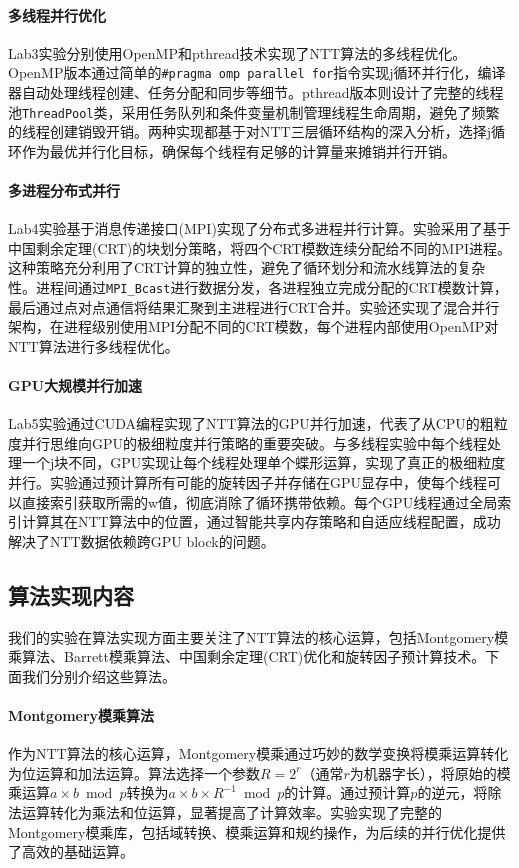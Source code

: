 \documentclass[a4paper]{article}
\begin{document}
\paragraph{多线程并行优化} Lab3实验分别使用OpenMP和pthread技术实现了NTT算法的多线程优化。OpenMP版本通过简单的\texttt{\#pragma omp parallel for}指令实现j循环并行化，编译器自动处理线程创建、任务分配和同步等细节。pthread版本则设计了完整的线程池\texttt{ThreadPool}类，采用任务队列和条件变量机制管理线程生命周期，避免了频繁的线程创建销毁开销。两种实现都基于对NTT三层循环结构的深入分析，选择j循环作为最优并行化目标，确保每个线程有足够的计算量来摊销并行开销。

\paragraph{多进程分布式并行} Lab4实验基于消息传递接口(MPI)实现了分布式多进程并行计算。实验采用了基于中国剩余定理(CRT)的块划分策略，将四个CRT模数连续分配给不同的MPI进程。这种策略充分利用了CRT计算的独立性，避免了循环划分和流水线算法的复杂性。进程间通过\texttt{MPI\_Bcast}进行数据分发，各进程独立完成分配的CRT模数计算，最后通过点对点通信将结果汇聚到主进程进行CRT合并。实验还实现了混合并行架构，在进程级别使用MPI分配不同的CRT模数，每个进程内部使用OpenMP对NTT算法进行多线程优化。

\paragraph{GPU大规模并行加速} Lab5实验通过CUDA编程实现了NTT算法的GPU并行加速，代表了从CPU的粗粒度并行思维向GPU的极细粒度并行策略的重要突破。与多线程实验中每个线程处理一个j块不同，GPU实现让每个线程处理单个蝶形运算，实现了真正的极细粒度并行。实验通过预计算所有可能的旋转因子并存储在GPU显存中，使每个线程可以直接索引获取所需的w值，彻底消除了循环携带依赖。每个GPU线程通过全局索引计算其在NTT算法中的位置，通过智能共享内存策略和自适应线程配置，成功解决了NTT数据依赖跨GPU block的问题。

\subsection{算法实现内容}

我们的实验在算法实现方面主要关注了NTT算法的核心运算，包括Montgomery模乘算法、Barrett模乘算法、中国剩余定理(CRT)优化和旋转因子预计算技术。下面我们分别介绍这些算法。

\paragraph{Montgomery模乘算法} 作为NTT算法的核心运算，Montgomery模乘通过巧妙的数学变换将模乘运算转化为位运算和加法运算。算法选择一个参数$R = 2^r$（通常$r$为机器字长），将原始的模乘运算$a \times b \bmod p$转换为$a \times b \times R^{-1} \bmod p$的计算。通过预计算$p$的逆元，将除法运算转化为乘法和位运算，显著提高了计算效率。实验实现了完整的Montgomery模乘库，包括域转换、模乘运算和规约操作，为后续的并行优化提供了高效的基础运算。
\end{document}

